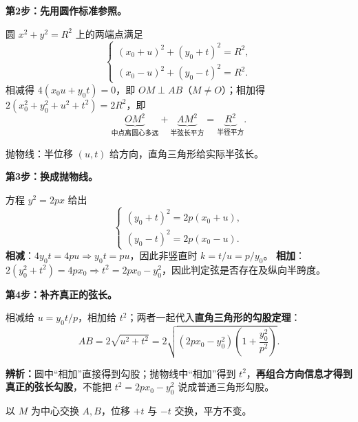 \begin{proofbox}
\par\noindent\textbf{第2步：先用圆作标准参照。}\par\nobreak\smallskip
圆 $x^2+y^2=R^2$ 上的两端点满足
\[
\begin{cases}
(x_0+u)^2+(y_0+t)^2=R^2,\\
(x_0-u)^2+(y_0-t)^2=R^2.
\end{cases}
\]
相减得 $4(x_0u+y_0t)=0$，即 $OM\perp AB$（$M\ne O$）；相加得
$2(x_0^2+y_0^2+u^2+t^2)=2R^2$，即
\[
\underbrace{OM^2}_{\text{中点离圆心多远}}
+\underbrace{AM^2}_{\text{半弦长平方}}
=\underbrace{R^2}_{\text{半径平方}}.
\]

\par
\begin{minipage}{\linewidth}
\begin{center}

\par\small 抛物线：半位移 $(u,t)$ 给方向，直角三角形给实际半弦长。
\end{center}
\end{minipage}
\par

\par\noindent\textbf{第3步：换成抛物线。}\par\nobreak\smallskip
方程 $y^2=2px$ 给出
\[
\begin{cases}
(y_0+t)^2=2p(x_0+u),\\
(y_0-t)^2=2p(x_0-u).
\end{cases}
\]
\textbf{相减}：$4y_0t=4pu\Rightarrow\boxed{y_0t=pu}$，因此非竖直时 $k=t/u=p/y_0$。
\textbf{相加}：$2(y_0^2+t^2)=4px_0\Rightarrow\boxed{t^2=2px_0-y_0^2}$，因此判定弦是否存在及纵向半跨度。

\par\noindent\textbf{第4步：补齐真正的弦长。}\par\nobreak\smallskip
相减给 $u=y_0t/p$，相加给 $t^2$；两者一起代入\textbf{直角三角形的勾股定理}：
\[
\boxed{\displaystyle AB=2\sqrt{u^2+t^2}
 =2\sqrt{(2px_0-y_0^2)\!\left(1+\frac{y_0^2}{p^2}\right)}}.
\]
\par\noindent\textbf{辨析：}圆中“相加”直接得到勾股；抛物线中“相加”得到 $t^2$，\textbf{再组合方向信息才得到真正的弦长勾股}，不能把 $t^2=2px_0-y_0^2$ 说成普通三角形勾股。


\par
\begin{minipage}{\linewidth}
\begin{center}

\par\small 以 $M$ 为中心交换 $A,B$，位移 $+t$ 与 $-t$ 交换，平方不变。
\end{center}
\end{minipage}
\par


\end{proofbox}
